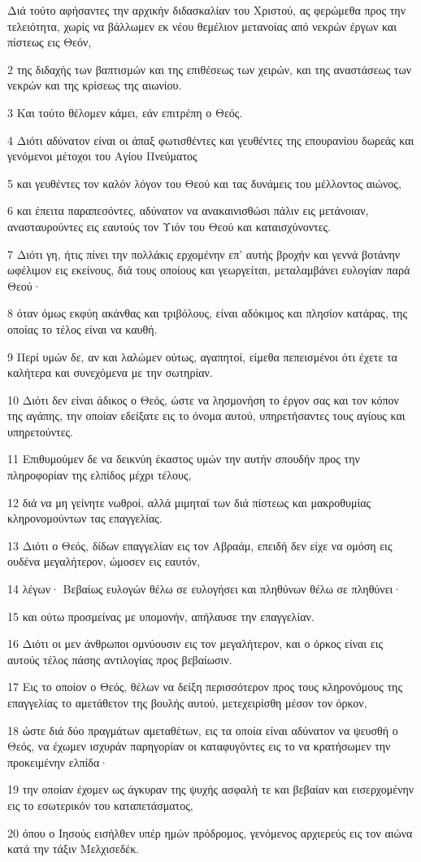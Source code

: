 \par Διά τούτο αφήσαντες την αρχικήν διδασκαλίαν του Χριστού, ας φερώμεθα προς την τελειότητα, χωρίς να βάλλωμεν εκ νέου θεμέλιον μετανοίας από νεκρών έργων και πίστεως εις Θεόν,
\par 2 της διδαχής των βαπτισμών και της επιθέσεως των χειρών, και της αναστάσεως των νεκρών και της κρίσεως της αιωνίου.
\par 3 Και τούτο θέλομεν κάμει, εάν επιτρέπη ο Θεός.
\par 4 Διότι αδύνατον είναι οι άπαξ φωτισθέντες και γευθέντες της επουρανίου δωρεάς και γενόμενοι μέτοχοι του Αγίου Πνεύματος
\par 5 και γευθέντες τον καλόν λόγον του Θεού και τας δυνάμεις του μέλλοντος αιώνος,
\par 6 και έπειτα παραπεσόντες, αδύνατον να ανακαινισθώσι πάλιν εις μετάνοιαν, ανασταυρούντες εις εαυτούς τον Υιόν του Θεού και καταισχύνοντες.
\par 7 Διότι γη, ήτις πίνει την πολλάκις ερχομένην επ' αυτής βροχήν και γεννά βοτάνην ωφέλιμον εις εκείνους, διά τους οποίους και γεωργείται, μεταλαμβάνει ευλογίαν παρά Θεού·
\par 8 όταν όμως εκφύη ακάνθας και τριβόλους, είναι αδόκιμος και πλησίον κατάρας, της οποίας το τέλος είναι να καυθή.
\par 9 Περί υμών δε, αν και λαλώμεν ούτως, αγαπητοί, είμεθα πεπεισμένοι ότι έχετε τα καλήτερα και συνεχόμενα με την σωτηρίαν.
\par 10 Διότι δεν είναι άδικος ο Θεός, ώστε να λησμονήση το έργον σας και τον κόπον της αγάπης, την οποίαν εδείξατε εις το όνομα αυτού, υπηρετήσαντες τους αγίους και υπηρετούντες.
\par 11 Επιθυμούμεν δε να δεικνύη έκαστος υμών την αυτήν σπουδήν προς την πληροφορίαν της ελπίδος μέχρι τέλους,
\par 12 διά να μη γείνητε νωθροί, αλλά μιμηταί των διά πίστεως και μακροθυμίας κληρονομούντων τας επαγγελίας.
\par 13 Διότι ο Θεός, δίδων επαγγελίαν εις τον Αβραάμ, επειδή δεν είχε να ομόση εις ουδένα μεγαλήτερον, ώμοσεν εις εαυτόν,
\par 14 λέγων· Βεβαίως ευλογών θέλω σε ευλογήσει και πληθύνων θέλω σε πληθύνει·
\par 15 και ούτω προσμείνας με υπομονήν, απήλαυσε την επαγγελίαν.
\par 16 Διότι οι μεν άνθρωποι ομνύουσιν εις τον μεγαλήτερον, και ο όρκος είναι εις αυτούς τέλος πάσης αντιλογίας προς βεβαίωσιν.
\par 17 Εις το οποίον ο Θεός, θέλων να δείξη περισσότερον προς τους κληρονόμους της επαγγελίας το αμετάθετον της βουλής αυτού, μετεχειρίσθη μέσον τον όρκον,
\par 18 ώστε διά δύο πραγμάτων αμεταθέτων, εις τα οποία είναι αδύνατον να ψευσθή ο Θεός, να έχωμεν ισχυράν παρηγορίαν οι καταφυγόντες εις το να κρατήσωμεν την προκειμένην ελπίδα·
\par 19 την οποίαν έχομεν ως άγκυραν της ψυχής ασφαλή τε και βεβαίαν και εισερχομένην εις το εσωτερικόν του καταπετάσματος,
\par 20 όπου ο Ιησούς εισήλθεν υπέρ ημών πρόδρομος, γενόμενος αρχιερεύς εις τον αιώνα κατά την τάξιν Μελχισεδέκ.

